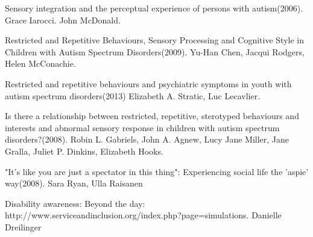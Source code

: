 \documentclass[11pt]{report}
\begin{document}
\begin{thebibliography}{9}
Sensory integration and the perceptual experience of persons with autism(2006). Grace Iarocci. John McDonald.

Restricted and Repetitive Behaviours, Sensory Processing and Cognitive Style in Children with Autism Spectrum Disorders(2009). Yu-Han Chen, Jacqui Rodgers, Helen McConachie.

Restricted and repetitive behaviours and psychiatric symptoms in youth with autism spectrum disorders(2013) Elizabeth A. Stratic, Luc Lecavlier.

Is there a relationship between restricted, repetitive, sterotyped behaviours and interests and abnormal sensory response in children with autism spectrum disorders?(2008). Robin L. Gabriels, John A. Agnew, Lucy Jane Miller, Jane Gralla, Juliet P. Dinkins, Elizabeth Hooks.

"It’s like you are just a spectator in this thing": Experiencing social life the 'aspie' way(2008). Sara Ryan, Ulla Raisanen

Disability awareness: Beyond the day: http://www.serviceandinclusion.org/index.php?page=simulations. Danielle Dreilinger

\end{thebibliography}
\end{document}
